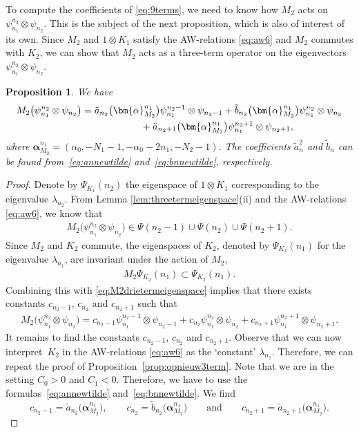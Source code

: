 \documentclass[10pt,a4paper]{amsart}
\numberwithin{equation}{section}
\newtheorem{Proposition}[Theorem]{Proposition}
 { \theoremstyle{definition}
\newtheorem{Definition}[Theorem]{Definition}
\newtheorem{Note}[Theorem]{Note}
\newtheorem{Example}[Theorem]{Example}
\newtheorem{Remark}[Theorem]{Remark} }
\begin{document}
To compute the coefficients of \eqref{eq:9terms}, we need to know how $M_2$ acts on $\psi_{n_1}^{n_2}\otimes \psi_{n_2}$. This is the subject of the next proposition, which is also of interest of its own. Since $M_2$ and $1\otimes K_1$ satisfy the AW-relations \eqref{eq:aw6} and $M_2$ commutes with $K_2$, we can show that $M_2$ acts as a three-term operator on the eigenvectors $\psi_{n_1}^{n_2}\otimes \psi_{n_2}$.
\begin{Proposition}\label{prop:casimir3term}
	We have
	\begin{gather*}
M_2\big(\psi_{n_1}^{n_2}\otimes \psi_{n_2}\big)= \tilde{a}_{n_2}\big(\bm{\alpha}_{M_2}^{n_1}\big)\psi_{n_1}^{n_2-1}\otimes \psi_{n_2-1}+\tilde{b}_{n_2}\big(\bm{\alpha}_{M_2}^{n_1}\big)\psi_{n_1}^{n_2}\otimes \psi_{n_2}\\
\hphantom{M_2\big(\psi_{n_1}^{n_2}\otimes \psi_{n_2}\big)=}{}
 +\tilde{a}_{n_2+1}\big(\bm{\alpha}_{M_2}^{n_1}\big)\psi_{n_1}^{n_2+1}\otimes \psi_{n_2+1}, %
	\end{gather*}
	where $\bm{\alpha}_{M_2}^{n_1}=(\alpha_0,-N_1-1,-\alpha_0-2n_1,-N_2-1)$. The coefficients $\tilde{a}_n^2$ and $\tilde{b}_n$ can be found from~\eqref{eq:annewtilde} and~\eqref{eq:bnnewtilde}, respectively.
\end{Proposition}
\begin{proof}
	Denote by $\Psi_{K_1}(n_2)$ the eigenspace of $1\otimes K_1$ corresponding to the eigenvalue $\lambda_{n_2}$. From Lemma \ref{lem:threetermeigenspace}(ii) and the AW-relations \eqref{eq:aw6}, we know that
	\begin{gather}
		M_2 \big(\psi_{n_1}^{n_2}\otimes \psi_{n_2}\big) \in \Psi({n_2}-1)\cup\Psi(n_2)\cup\Psi (n_2+1).\label{eq:M2drietermeigenspace}
	\end{gather}
	Since $M_2$ and $K_2$ commute, the eigenspaces of $K_2$, denoted by $\Psi_{K_2}(n_1)$ for the eigenvalue $\lambda_{n_1}$, are invariant under the action of $M_2$,
	\begin{gather*}
		M_2 \Psi_{K_2}(n_1) \subset \Psi_{K_2}(n_1).
	\end{gather*}
	Combining this with \eqref{eq:M2drietermeigenspace} implies that there exists constants $c_{n_2-1}$, $c_{n_2}$ and $c_{n_2+1}$ such that
	\begin{gather*}
		M_2 \big(\psi_{n_1}^{n_2}\otimes \psi_{n_2}\big) = c_{n_2-1}\psi_{n_1}^{n_2-1}\otimes \psi_{n_2-1}+c_{n_2}\psi_{n_1}^{n_2}\otimes \psi_{n_2}+c_{n_2+1}\psi_{n_1}^{n_2+1}\otimes \psi_{n_2+1}.
	\end{gather*}
	It remains to find the constants $c_{n_2-1}$, $c_{n_2}$ and $c_{n_2+1}$. Observe that we can now interpret~$K_2$ in the AW-relations \eqref{eq:aw6} as the `constant' $\lambda_{n_1}$. Therefore, we can repeat the proof of Proposition~\ref{prop:opnieuw3term}. Note that we are in the setting $C_0>0$ and $C_1 <0$. Therefore, we have to use the formulas~\eqref{eq:annewtilde} and~\eqref{eq:bnnewtilde}. We find
	\[
	c_{n_2-1}=\tilde{a}_{n_2}\big(\bm{\alpha}_{M_2}^{n_1}\big),\qquad c_{n_2}=\tilde{b}_{n_2}\big(\bm{\alpha}_{M_2}^{n_1}\big)\qquad \text{and}\qquad c_{n_2+1}=\tilde{a}_{n_2+1}\big(\bm{\alpha}_{M_2}^{n_1}\big).\tag*{\qed}
	\]\renewcommand{\qed}{}
\end{proof}
\end{document}
